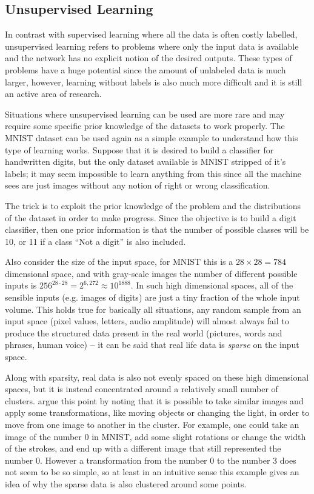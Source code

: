 \subsection{Unsupervised Learning} \label{sub:unsupervised_learning}
In contrast with supervised learning where all the data is often costly labelled, unsupervised learning refers to problems where only the input data is available and the network has no explicit notion of the desired outputs. These types of problems have a huge potential since the amount of unlabeled data is much larger, however, learning without labels is also much more difficult and it is still an active area of research.

Situations where unsupervised learning can be used are more rare and may require some specific prior knowledge of the datasets to work properly. The \gls{MNIST} dataset can be used again as a simple example to understand how this type of learning works. Suppose that it is desired to build a classifier for handwritten digits, but the only dataset available is \gls{MNIST} stripped of it's labels; it may seem impossible to learn anything from this since all the machine sees are just images without any notion of right or wrong classification.

The trick is to exploit the prior knowledge of the problem and the distributions of the dataset in order to make progress. Since the objective is to build a digit classifier, then one prior information is that the number of possible classes will be 10, or 11 if a class ``Not a digit'' is also included.

Also consider the size of the input space, for \gls{MNIST} this is a $28{\times}28 = 784$ dimensional space, and with gray-scale images the number of different possible inputs is $256^{28\cdot28} = 2^{6,272} \approx 10^{1888}$. In such high dimensional spaces, all of the sensible inputs (e.g. images of digits) are just a tiny fraction of the whole input volume. This holds true for basically all situations, any random sample from an input space (pixel values, letters, audio amplitude) will almost always fail to produce the structured data present in the real world (pictures, words and phrases, human voice) \cite[chap. 5]{deepLearningBook2016} \textbf{--} it can be said that real life data is \textit{sparse} on the input space.

Along with sparsity, real data is also not evenly spaced on these high dimensional spaces, but it is instead concentrated around a relatively small number of clusters. \textcite[chap. 5]{deepLearningBook2016} argue this point by noting that it is possible to take similar images and apply some transformations, like moving objects or changing the light, in order to move from one image to another in the cluster. For example, one could take an image of the number 0 in \gls{MNIST}, add some slight rotations or change the width of the strokes, and end up with a different image that still represented the number 0. However a transformation from the number 0 to the number 3 does not seem to be so simple, so at least in an intuitive sense this example gives an idea of why the sparse data is also clustered around some points.

